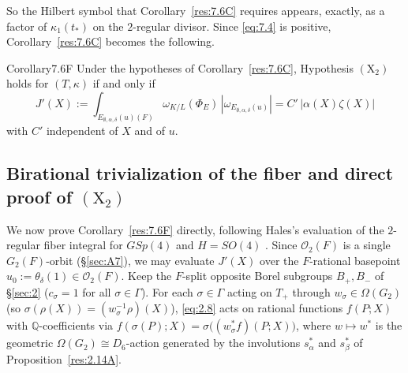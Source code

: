 \documentclass[12pt,letterpaper]{amsart}
\theoremstyle{plain}
\theoremstyle{definition}
\theoremstyle{remark}
\theoremstyle{definition}
\newcommand{\qqq}{\mathbb{Q}}
\begin{document}
So the Hilbert symbol that Corollary~\ref{res:7.6C} requires appears, exactly,
as a factor of $\kappa_1(t_*)$ on the $2$-regular divisor. Since
\eqref{eq:7.4} is positive, Corollary~\ref{res:7.6C} becomes the following.

\begin{res}{Corollary}{7.6F}\label{res:7.6F}
Under the hypotheses of Corollary~\ref{res:7.6C}, Hypothesis $(\mathrm X_2)$
holds for $(T,\kappa)$ if and only if
\[
J'(X):=\int_{E_{\emptyset,\alpha,\delta}(u)(F)}\omega_{K/L}(\Phi_E)\,
|\omega_{E_{\emptyset,\alpha,\delta}(u)}|=C'\,|\alpha(X)\zeta(X)|
\]
with $C'$ independent of $X$ and of $u$.
\end{res}

\subsection*{Birational trivialization of the fiber and direct proof of \texorpdfstring{$(\mathrm X_2)$}{(X2)}}

We now prove Corollary~\ref{res:7.6F} directly, following Hales's evaluation of
the $2$-regular fiber integral for $GSp(4)$ and $H=SO(4)$
\cite[\S6, pp.~239--243]{Ha89}. Since $\mathcal O_2(F)$ is a single $G_2(F)$-orbit
(\S\ref{sec:A7}), we may evaluate $J'(X)$ over the $F$-rational basepoint
$u_0:=\theta_\delta(1)\in\mathcal O_2(F)$. Keep the $F$-split opposite Borel
subgroups $B_+,B_-$ of \S\ref{sec:2} ($c_\sigma=1$ for all $\sigma\in\Gamma$).
For each $\sigma\in\Gamma$ acting on $T_+$ through $w_\sigma\in\Omega(G_2)$
(so $\sigma(\rho(X))=(w_\sigma^{-1}\rho)(X)$), \eqref{eq:2.8} acts on rational
functions $f(P;X)$ with $\qqq$-coefficients via
$f(\sigma(P);X)=\sigma\bigl((w_\sigma^*f)(P;X)\bigr)$, where $w\mapsto w^*$ is
the geometric $\Omega(G_2)\cong D_6$-action generated by the involutions
$s_\alpha^*$ and $s_\beta^*$ of Proposition~\ref{res:2.14A}.
\end{document}

